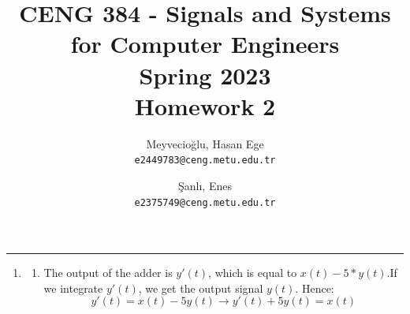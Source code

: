 \documentclass[10pt,a4paper, margin=1in]{article}
\author{
  Meyvecioğlu, Hasan Ege\\
  \texttt{e2449783@ceng.metu.edu.tr}
  \and
  Şanlı, Enes\\
  \texttt{e2375749@ceng.metu.edu.tr}
}
\title{CENG 384 - Signals and Systems for Computer Engineers \\
Spring 2023 \\
Homework 2}
\begin{document}
\maketitle



\noindent\rule{19cm}{1.2pt}

\begin{enumerate}

\item %
    \begin{enumerate}
    \item %
The output of the adder is $y'(t)$, which is equal to $x(t) - 5*y(t)$.If we integrate $y'(t)$, we get the output signal $y(t)$. Hence:
\begin{equation}
    y'(t) = x(t) - 5y(t) \rightarrow y'(t) + 5y(t)= x(t) 
\end{equation}



\end{enumerate}
\end{enumerate}
\end{document}
